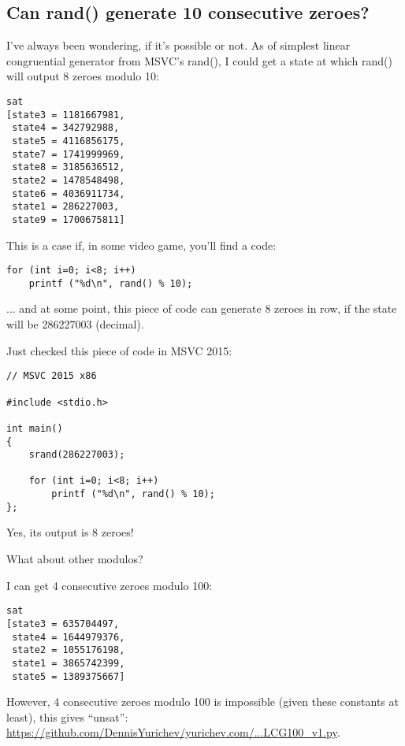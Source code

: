 \subsection{Can rand() generate 10 consecutive zeroes?}

\renewcommand{\CURPATH}{equations/LCG}

I've always been wondering, if it's possible or not.
As of simplest linear congruential generator from MSVC's rand(), I could get a state at which rand() will output 8 zeroes modulo 10:



\begin{lstlisting}
sat
[state3 = 1181667981,
 state4 = 342792988,
 state5 = 4116856175,
 state7 = 1741999969,
 state8 = 3185636512,
 state2 = 1478548498,
 state6 = 4036911734,
 state1 = 286227003,
 state9 = 1700675811]
\end{lstlisting}

This is a case if, in some video game, you'll find a code:

\begin{lstlisting}
for (int i=0; i<8; i++)
    printf ("%d\n", rand() % 10);
\end{lstlisting}

... and at some point, this piece of code can generate 8 zeroes in row, if the state will be 286227003 (decimal).

Just checked this piece of code in MSVC 2015:

\begin{lstlisting}
// MSVC 2015 x86

#include <stdio.h>

int main()
{
	srand(286227003);

	for (int i=0; i<8; i++)
		printf ("%d\n", rand() % 10);
};
\end{lstlisting}

Yes, its output is 8 zeroes!

What about other modulos?

I can get 4 consecutive zeroes modulo 100:



\begin{lstlisting}
sat
[state3 = 635704497,
 state4 = 1644979376,
 state2 = 1055176198,
 state1 = 3865742399,
 state5 = 1389375667]
\end{lstlisting}

However, 4 consecutive zeroes modulo 100 is impossible (given these constants at least), this gives ``unsat'':
\url{https://github.com/DennisYurichev/yurichev.com/...LCG100_v1.py}.

